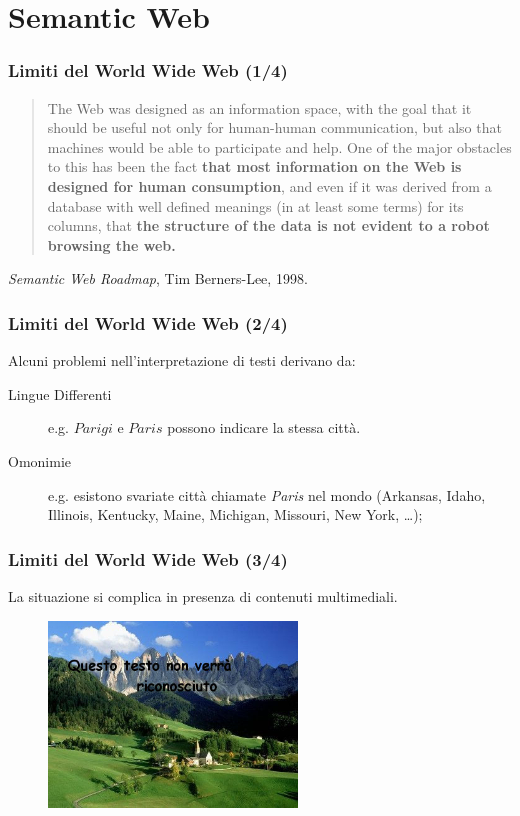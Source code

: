 \documentclass[8pt]{beamer}
\begin{document}
\section{Semantic Web}
\begin{frame}
\frametitle{Limiti del World Wide Web (1/4)}
\begin{quote}
The Web was designed as an information space, with the goal that it should be 
useful not only for human-human communication, but also that machines would be
able to participate and help. One of the major obstacles to this has been the
fact \textbf{that most information on the Web is designed for human consumption}, and 
even if it was derived from a database with well defined meanings (in at least 
some terms) for its columns, that \textbf{the structure of the data is not evident to 
a robot browsing the web.}  
\end{quote}
\vspace{\baselineskip}
\emph{Semantic Web Roadmap}, Tim Berners-Lee, 1998.
\end{frame}

\begin{frame}
\frametitle{Limiti del World Wide Web (2/4)}
Alcuni problemi nell'interpretazione di testi derivano da:
\begin{description}
 \item[Lingue Differenti] e.g. $Parigi$ e $Paris$ possono indicare la stessa citt\`a.
 \item[Omonimie] e.g. esistono svariate citt\`a chiamate 
 \emph{Paris} nel mondo (Arkansas, Idaho, Illinois, Kentucky,
 Maine, Michigan, Missouri, New York, \ldots);
\end{description}
\end{frame}

\begin{frame}
\frametitle{Limiti del World Wide Web (3/4)}

La situazione si complica in presenza di contenuti multimediali.

\begin{figure}
    \includegraphics[width=250px]{unrecognizable.jpg} 
\end{figure}
\end{frame}
\end{document}

